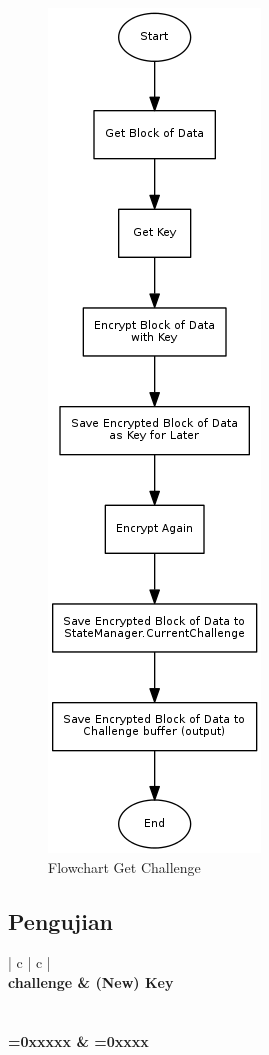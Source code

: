 \begin{figure}[!h]
\centering
\includegraphics[height=0.75\textheight]{image/state/flow_getchallenge.png}
\caption{Flowchart Get Challenge}
\label{fig-flow-getchallenge}
\end{figure}

\subsection {Pengujian}

\begin{table}[!h]
  \centering
  \begin{tabular}{ | c | c | }
    \hline
     \\
    \hline
    \bf{challenge} & \bf{(New) Key} \\
    \hline
     \\
     \\
    \hline
    =0xxxxx & =0xxxx \\
    \hline
  \end{tabular}
  \caption{Test Vector Fungsi State Get Challenge}
  \label{tabel-test-getchallenge}
\end{table}

